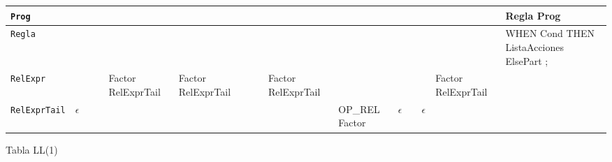 \begin{landscape}
\begin{longtable}{|l|l|l|l|l|l|l|l|l|l|l|l|l|l|l|}
\hline
\texttt{Prog} &  &  &  &  &  &  &  &  &  &  &  &  &  & Regla Prog \\ 
\hline
\texttt{Regla} &  &  &  &  &  &  &  &  &  &  &  &  &  & WHEN Cond THEN ListaAcciones ElsePart ; \\ 
\hline
\texttt{RelExpr} &  &  &  & Factor RelExprTail & Factor RelExprTail &  &  & Factor RelExprTail &  &  &  &  & Factor RelExprTail &  \\ 
\hline
\texttt{RelExprTail} & $\epsilon$ &  &  &  &  &  &  &  & OP\_REL Factor & $\epsilon$ &  & $\epsilon$ &  &  \\ 
\hline
\end{longtable}
\caption{Tabla LL(1)}
\label{tab:ll1}
\end{landscape}
